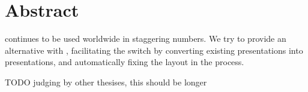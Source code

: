 
 \chapter*{Abstract}

  \ppt continues to be used worldwide in staggering numbers. We try to provide
  an alternative with \mxp, facilitating the switch by converting existing \ppt
  presentations into \mxp presentations, and automatically fixing the layout in
  the process.

  TODO judging by other thesises, this should be longer


